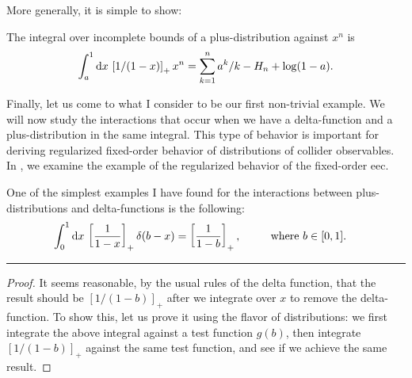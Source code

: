 \begin{subappendices}
More generally, it is simple to show:
~\\
\begin{example}{}
    The integral over incomplete bounds of a plus-distribution against \(x^n\) is
    \begin{align}
        \int_{a}^{1} \dd x\,\left[1/(1-x)\right]_+ x^n
        =
        \sum_{k=1}^n a^k/k - H_n + \log(1-a).
    \end{align}
\end{example}

Finally, let us come to what I consider to be our first non-trivial example.
%
We will now study the interactions that occur when we have a delta-function and a plus-distribution in the same integral.
%
This type of behavior is important for deriving regularized fixed-order behavior of distributions of collider observables.
%
In , we examine the example of the regularized behavior of the fixed-order \gls{eec}.
~\\
\begin{example}{}
    One of the simplest examples I have found for the interactions between plus-distributions and delta-functions is the following:
    \begin{align}
        \int_{0}^{1} \dd x\,\left[\frac{1}{1-x}\right]_+ \delta(b - x)
        &=
        \left[\frac{1}{1-b}\right]_+
        ,
        ~~~~~~~~
        \text{where}~b \in [0,1].
    \end{align}

\vspace{7pt}
\hrule
\vspace{7pt}

\begin{proof}
It seems reasonable, by the usual rules of the delta function, that the result should be \([1/(1-b)]_+\) after we integrate over \(x\) to remove the delta-function.
%
To show this, let us prove it using the flavor of distributions:
%
we first integrate the above integral against a test function \(g(b)\), then integrate \([1/(1-b)]_+\) against the same test function, and see if we achieve the same result.


\end{proof}
\end{example}
\end{subappendices}
